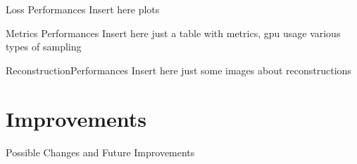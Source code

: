 \documentclass{beamer}
\begin{document}
\begin{frame}{Loss Performances}
Insert here plots
\end{frame}

\begin{frame}{Metrics Performances}
Insert here just a table with metrics, gpu usage
various types of sampling
\end{frame}

\begin{frame}{ReconstructionPerformances}
Insert here just some images about reconstructions
\end{frame}

\section{Improvements}

\begin{frame}{Possible Changes and Future Improvements}
\end{frame}

\backmatter
\end{document}
